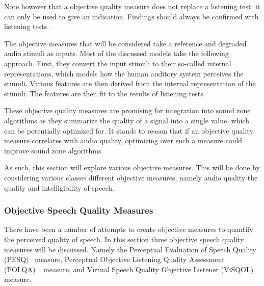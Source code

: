 Note however that a objective quality measure does not replace a listening test: it can only be used to give an 
indication.
Findings should always be confirmed with listening tests.

The objective measures that will be considered take a reference and degraded audio stimuli as inputs.
Most of the discussed models take the following approach.
First, they convert the input stimuli to their so-called internal representations, which models how the 
human auditory system perceives the stimuli.
Various features are then derived from the internal representation of the stimuli.
The features are then fit to the results of listening tests.

These objective quality measures are promising for integration into sound zone algorithms as they summarize the 
quality of a signal into a single value, which can be potentially optimized for. 
It stands to reason that if an objective quality measure correlates with audio quality, optimizing over such a measure
could improve sound zone algorithms.

As such, this section will explore various objective measures.
This will be done by considering various classes different objective measures, namely audio quality the quality and intelligibility of speech. 

\subsubsection{Objective Speech Quality Measures}
There have been a number of attempts to create objective measures to quantify the perceived quality of speech.
In this section three objective speech quality measures will be discussed.
Namely the Perceptual Evaluation of Speech Quality (PESQ)~\cite{rix2001perceptual} measure,
Perceptual Objective Listening Quality Assessment (POLQA)~\cite{beerends2013perceptual}. measure, and 
Virtual Speech Quality Objective Listener (ViSQOL)~\cite{hines2012visqol,chinen2020visqol} measure.

